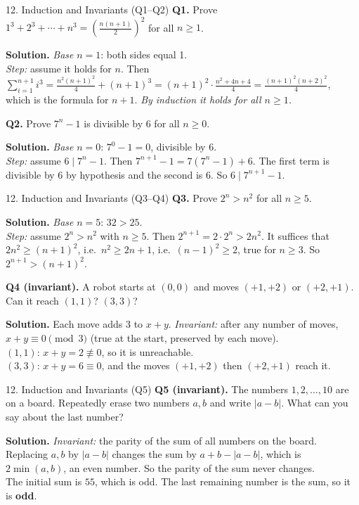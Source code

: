 \documentclass[aspectratio=169,10pt]{beamer}
\newcommand{\qa}[3]{%
  \textbf{Q#1.} #2\par\smallskip
  {\color{ans}\textbf{Solution.} #3}\par\vspace{6pt}}
\begin{document}
\begin{frame}{12. Induction and Invariants (Q1--Q2)}
\footnotesize
\qa{1}{Prove $1^3+2^3+\cdots+n^3=\left(\frac{n(n+1)}{2}\right)^2$ for all $n\ge1$.}
{\emph{Base} $n=1$: both sides equal 1.\\
\emph{Step:} assume it holds for $n$. Then $\sum_{i=1}^{n+1}i^3=\frac{n^2(n+1)^2}{4}+(n+1)^3=(n+1)^2\cdot\frac{n^2+4n+4}{4}=\frac{(n+1)^2(n+2)^2}{4}$,\\
which is the formula for $n+1$. \emph{By induction it holds for all $n\ge1$.}}
\qa{2}{Prove $7^n-1$ is divisible by 6 for all $n\ge0$.}
{\emph{Base} $n=0$: $7^0-1=0$, divisible by 6.\\
\emph{Step:} assume $6\mid7^n-1$. Then $7^{n+1}-1=7(7^n-1)+6$. The first term is divisible by 6 by hypothesis and the second is $6$. So $6\mid7^{n+1}-1$.}
\end{frame}

\begin{frame}{12. Induction and Invariants (Q3--Q4)}
\footnotesize
\qa{3}{Prove $2^n>n^2$ for all $n\ge5$.}
{\emph{Base} $n=5$: $32>25$.\\
\emph{Step:} assume $2^n>n^2$ with $n\ge5$. Then $2^{n+1}=2\cdot2^n>2n^2$. It suffices that $2n^2\ge(n+1)^2$, i.e.\ $n^2\ge2n+1$, i.e.\ $(n-1)^2\ge2$, true for $n\ge3$. So $2^{n+1}>(n+1)^2$.}
\qa{4 (invariant)}{A robot starts at $(0,0)$ and moves $(+1,+2)$ or $(+2,+1)$. Can it reach $(1,1)$? $(3,3)$?}
{Each move adds 3 to $x+y$. \emph{Invariant:} after any number of moves, $x+y\equiv0\pmod3$ (true at the start, preserved by each move).\\
$(1,1)$: $x+y=2\not\equiv0$, so it is unreachable.\\
$(3,3)$: $x+y=6\equiv0$, and the moves $(+1,+2)$ then $(+2,+1)$ reach it.}
\end{frame}

\begin{frame}{12. Induction and Invariants (Q5)}
\footnotesize
\qa{5 (invariant)}{The numbers $1,2,\dots,10$ are on a board. Repeatedly erase two numbers $a,b$ and write $|a-b|$. What can you say about the last number?}
{\emph{Invariant:} the parity of the sum of all numbers on the board.\\
Replacing $a,b$ by $|a-b|$ changes the sum by $a+b-|a-b|$, which is $2\min(a,b)$, an even number. So the parity of the sum never changes.\\
The initial sum is $55$, which is odd. The last remaining number is the sum, so it is \textbf{odd}.}
\end{frame}
\end{document}
